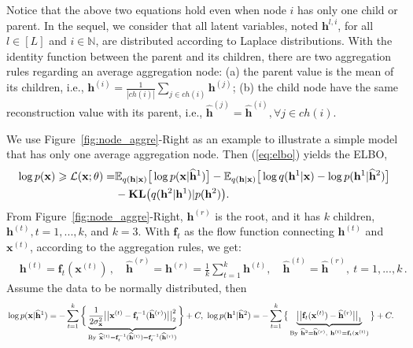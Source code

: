 \documentclass{article}
\begin{document}
Notice that the above two equations hold even when node $i$ has only one child or parent.
In the sequel, we consider that all latent variables, noted $\mathbf{h}^{l, i}$, for all $l \in [L]$ and $i \in \mathbb{N}$, are distributed according to Laplace distributions. 
With the identity function between the  parent and its children, there are two aggregation rules regarding an average aggregation node: (a) the parent value is the mean of its children, i.e., $\mathbf{h}^{(i)} = \frac{1}{|ch(i)|} \sum_{j \in ch(i)} \mathbf{h}^{(j)}$; (b) the  child node have the same reconstruction value with its parent, i.e., $\widehat{\mathbf{h}}^{(j)} = \widehat{\mathbf{h}}^{(i)}, \forall j \in ch(i)$. 


We use Figure~\ref{fig:node_aggre}-Right as an example to illustrate a simple model that  has only one average aggregation node. Then (\ref{eq:elbo}) yields the ELBO,
\begin{align}  \label{eq:one_agg_node}
\log p(\mathbf{x})   \geqslant  \mathcal{L}(\mathbf{x}; \theta)=& \mathbb{E}_{q(\mathbf{h} | \mathbf{x})} \big[\log p(\mathbf{x}|\widehat{\mathbf{h}}^1)\big] -\mathbb{E}_{q(\mathbf{h} | \mathbf{x})} \big[\log q(\mathbf{h}^1 | \mathbf{x}) -\log p(\mathbf{h}^1|\widehat{\mathbf{h}}^2)\big] \\ \notag
&- \textbf{\text{KL}}\big(q(\mathbf{h}^2 | \mathbf{h}^1) | p(\mathbf{h}^2)\big).
\end{align}%
From  Figure~\ref{fig:node_aggre}-Right,  $\mathbf{h}^{(r)}$ is the root, and it has $k$ children, $\mathbf{h}^{(t)}, t = 1,...,k$, and $k=3$. 
With $\mathbf{f}_t$ as the flow function connecting $\mathbf{h}^{(t)}$ and $\mathbf{x}^{(t)}$, according to the aggregation rules, we get:
\begin{equation}
\begin{split}
& \mathbf{h}^{(t)} = \mathbf{f}_t(\mathbf{x}^{(t)})\, ,\quad  \widehat{\mathbf{h}}^{(r)} = \mathbf{h}^{(r)} = \frac{1}{k}\sum_{t=1}^k \mathbf{h}^{(t)} , \quad \widehat{\mathbf{h}}^{(t)}= \widehat{\mathbf{h}}^{(r)}, \ t = 1,...,k \, .
 \end{split}
 \end{equation}%
 Assume the data to be normally distributed, then 
 {\small
\begin{align}\notag
 &\log p(\mathbf{x}|\widehat{\mathbf{h}}^1) 
 =-\sum_{t=1}^k\bigg\{ \underbrace{\frac{1}{2\sigma^2_{\mathbf{x}}}\big|\big| \mathbf{x}^{(t)} - \mathbf{f}_t^{-1}(\widehat{\mathbf{h}}^{(r)})\big|\big|_2^2 }_{\textrm{By} \  \widehat{\mathbf{x}}^{(t)}=\mathbf{f}_t^{-1}(\widehat{\mathbf{h}}^{(t)})=\mathbf{f}_t^{-1}(\widehat{\mathbf{h}}^{(r)})} \bigg\}+C , \  \log p(\mathbf{h}^1|\widehat{\mathbf{h}}^2) = -\sum_{t=1}^k\big\{ \underbrace{\big|\big|  \mathbf{f}_t(\mathbf{x}^{(t)}) - \widehat{\mathbf{h}}^{(r)}\big|\big|_1}_{\textrm{By} \  \widehat{\mathbf{h}}^{2}= \widehat{\mathbf{h}}^{(r)}, \  \mathbf{h}^{(t)} = \mathbf{f}_t(\mathbf{x}^{(t)})} \big\} +C .
 \end{align} 
 }
\end{document}
